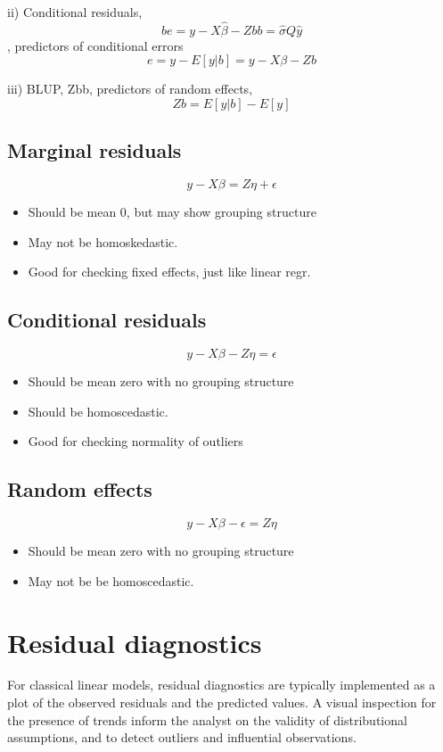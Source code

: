 \documentclass[Chap5amain.tex]{subfiles}
\begin{document}

ii) Conditional residuals, 
\[be = y − X\hat{\beta} − Zbb = \hat{\sigma}Q\hat{y}\] , predictors of
conditional errors 
\[e = y − E[y|b] = y − X\beta − Zb\]

iii) BLUP, Zbb, predictors of random effects,
\[ Zb = E[y|b] − E[y]\]


\newpage

\subsection*{Marginal residuals}

\[y - X\beta = Z \eta +\epsilon \]
\begin{itemize}
\item
Should be mean 0, but may show grouping structure
\item
May not be homoskedastic.
\item
Good for checking fixed effects, just like linear regr.
\end{itemize}
\subsection*{Conditional residuals}
\[y - X\beta - Z \eta = \epsilon \]
\begin{itemize}
\item
Should be mean zero with no grouping structure
\item
Should be homoscedastic.
\item
Good for checking normality of outliers
\end{itemize}

\subsection*{Random effects}
\[y - X\beta -\epsilon = Z \eta \]
\begin{itemize}
\item
Should be mean zero with no grouping structure
\item
May not be be homoscedastic.
\end{itemize}

\section{Residual diagnostics} %
For classical linear models, residual diagnostics are typically implemented as a plot of the observed residuals and the predicted values. A visual inspection for the presence of trends inform the analyst on the validity of distributional assumptions, and to detect outliers and influential observations.
\end{document}
